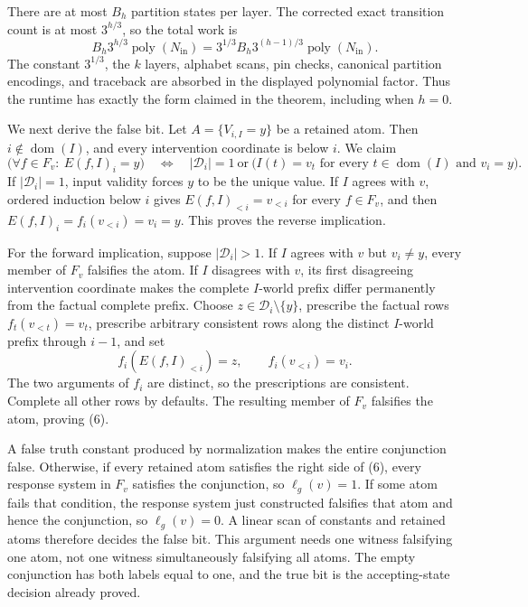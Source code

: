 There are at most \(B_h\) partition states per layer. The corrected exact transition count is at most \(3^{h/3}\), so the total work is
\[
 B_h3^{h/3}\operatorname{poly}(N_{\mathrm{in}})
 =3^{1/3}B_h3^{(h-1)/3}\operatorname{poly}(N_{\mathrm{in}}).
\]
The constant \(3^{1/3}\), the \(k\) layers, alphabet scans, pin checks, canonical partition encodings, and traceback are absorbed in the displayed polynomial factor. Thus the runtime has exactly the form claimed in the theorem, including when \(h=0\).

We next derive the false bit. Let \(A=\{V_{i,I}=y\}\) be a retained atom. Then \(i\notin\operatorname{dom}(I)\), and every intervention coordinate is below \(i\). We claim
\[
 \bigl(\forall f\in F_v:\ E(f,I)_i=y\bigr)
 \quad\Longleftrightarrow\quad
 |\mathcal D_i|=1
 \ \text{or}\ 
 \bigl(I(t)=v_t\text{ for every }t\in\operatorname{dom}(I)\text{ and }v_i=y\bigr).
 \tag{6}
\]
If \(|\mathcal D_i|=1\), input validity forces \(y\) to be the unique value. If \(I\) agrees with \(v\), ordered induction below \(i\) gives \(E(f,I)_{<i}=v_{<i}\) for every \(f\in F_v\), and then \(E(f,I)_i=f_i(v_{<i})=v_i=y\). This proves the reverse implication.

For the forward implication, suppose \(|\mathcal D_i|>1\). If \(I\) agrees with \(v\) but \(v_i\neq y\), every member of \(F_v\) falsifies the atom. If \(I\) disagrees with \(v\), its first disagreeing intervention coordinate makes the complete \(I\)-world prefix differ permanently from the factual complete prefix. Choose \(z\in\mathcal D_i\setminus\{y\}\), prescribe the factual rows \(f_t(v_{<t})=v_t\), prescribe arbitrary consistent rows along the distinct \(I\)-world prefix through \(i-1\), and set
\[
 f_i(E(f,I)_{<i})=z,
 \qquad
 f_i(v_{<i})=v_i.
\]
The two arguments of \(f_i\) are distinct, so the prescriptions are consistent. Complete all other rows by defaults. The resulting member of \(F_v\) falsifies the atom, proving (6).

A false truth constant produced by normalization makes the entire conjunction false. Otherwise, if every retained atom satisfies the right side of (6), every response system in \(F_v\) satisfies the conjunction, so \(\ell_g(v)=1\). If some atom fails that condition, the response system just constructed falsifies that atom and hence the conjunction, so \(\ell_g(v)=0\). A linear scan of constants and retained atoms therefore decides the false bit. This argument needs one witness falsifying one atom, not one witness simultaneously falsifying all atoms. The empty conjunction has both labels equal to one, and the true bit is the accepting-state decision already proved.

